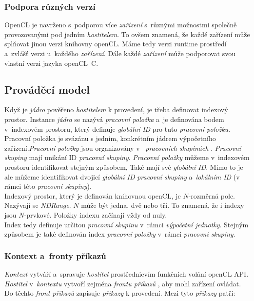 \subsubsection{Podpora různých verzí}

OpenCL je navrženo s~podporou více \emph{zařízení} s~různými možnostmi společně provozovanými pod jedním \emph{hostitelem}. To ovšem znamená, že každé zařízení může splňovat jinou verzi knihovny openCL. Máme tedy verzi runtime prostředí a~zvlášť verzi u~každého \emph{zařízení}. Dále každé \emph{zařízení} může podporovat svou vlastní verzi
jazyka openCL~C.


\subsection{Prováděcí model}

Když je \emph{jádro} pověřeno \emph{hostitelem} k provedení, je třeba definovat indexový prostor. Instance \emph{jádra}  se nazývá \emph{pracovní položka}  a~je definována bodem v~indexovém prostoru, který definuje \emph{globální ID}  pro tuto \emph{pracovní položku}. Pracovní položka je svázánu s jedním, konkrétním jádrem výpočetního zařízení.\emph{Pracovní položky}
jsou organizovány v~ \emph{pracovních skupinách} .
\emph{Pracovní skupiny} mají unikání ID \emph{pracovní skupiny}. \emph{Pracovní položky} můžeme v~indexovém prostoru identifikovat stejným způsobem, Také mají své \emph{globální ID}. Mimo to je ale můžeme identifikovat dvojicí \emph{globální ID} \emph{pracovní skupiny} a~\emph{lokálním ID} (v rámci této \emph{pracovní skupiny}).
\\
Indexový prostor, který je definován knihovnou openCL, je $N$-rozměrná pole. Nazývají se \emph{NDRange}. $N$ může být jedna, dvě nebo tři. To znamená, že i indexy jsou $N$-prvkové. Položky indexu začínají vždy od nuly.
\\
Index tedy definuje určitou \emph{pracovní skupinu} v~rámci \emph{výpočetní jednotky}. Stejným způsobem je také definován index \emph{pracovní položky} v~rámci \emph{pracovní skupiny}.

\subsubsection{Kontext a~fronty příkazů}	

\emph{Kontext}  vytváří a~spravuje \emph{hostitel} prostřednicvím funkčních volání openCL API. \emph{Hostitel} v~\emph{kontextu} vytvoří zejména \emph{frontu příkazů} , aby mohl zařízení ovládat. Do těchto \emph{front příkazů} zapisuje \emph{příkazy} k provedení. Mezi tyto \emph{příkazy} patří:

